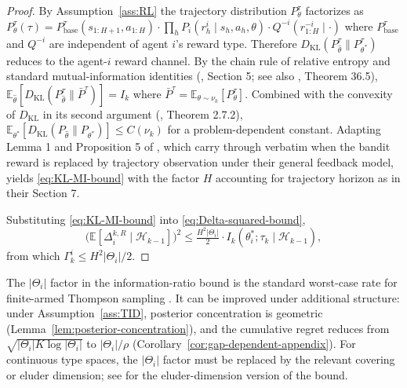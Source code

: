 \begin{proof}
By Assumption~\ref{ass:RL} the trajectory distribution $P_\theta^\tau$ factorizes as $P_\theta^\tau(\tau) = P_{\mathrm{base}}^\tau(s_{1:H+1}, a_{1:H}) \cdot \prod_h P_i(r_h^i \mid s_h, a_h, \theta) \cdot Q^{-i}(r^{-i}_{1:H} \mid \cdot)$ where $P_{\mathrm{base}}^\tau$ and $Q^{-i}$ are independent of agent $i$'s reward type. Therefore $D_{\mathrm{KL}}(P_{\hat{\theta}}^\tau \| P_{\theta^*}^\tau)$ reduces to the agent-$i$ reward channel. By the chain rule of relative entropy and standard mutual-information identities (\citealp{russo2016information}, Section 5; see also \citealp{lattimore2020bandit}, Theorem 36.5), $\mathbb{E}_{\hat{\theta}}[D_{\mathrm{KL}}(P_{\hat{\theta}}^\tau \| \bar{P}^\tau)] = I_k$ where $\bar{P}^\tau = \mathbb{E}_{\theta \sim \nu_k}[P_\theta^\tau]$. Combined with the convexity of $D_{\mathrm{KL}}$ in its second argument (\citealp{cover2006elements}, Theorem 2.7.2), $\mathbb{E}_{\theta^*}[D_{\mathrm{KL}}(P_{\hat{\theta}} \| P_{\theta^*})] \leq C(\nu_k)$ for a problem-dependent constant. Adapting Lemma 1 and Proposition 5 of \citet{russo2016information}, which carry through verbatim when the bandit reward is replaced by trajectory observation under their general feedback model, yields \eqref{eq:KL-MI-bound} with the factor $H$ accounting for trajectory horizon as in their Section 7.

Substituting \eqref{eq:KL-MI-bound} into \eqref{eq:Delta-squared-bound},
\begin{equation}
\big(\mathbb{E}[\Delta_i^{k,R} \mid \mathcal{H}_{k-1}]\big)^2 \leq \tfrac{H^2 |\Theta_i|}{2} \cdot I_k(\theta_i^*; \tau_k \mid \mathcal{H}_{k-1}),
\end{equation}
from which $\Gamma_k^i \leq H^2 |\Theta_i|/2$.
\end{proof}

\begin{remark}
\label{rem:info-ratio-tight}
The $|\Theta_i|$ factor in the information-ratio bound is the standard worst-case rate for finite-armed Thompson sampling \citep{russo2016information}. It can be improved under additional structure: under Assumption~\ref{ass:TID}, posterior concentration is geometric (Lemma~\ref{lem:posterior-concentration}), and the cumulative regret reduces from $\sqrt{|\Theta_i| K \log|\Theta_i|}$ to $|\Theta_i|/\rho$ (Corollary~\ref{cor:gap-dependent-appendix}). For continuous type spaces, the $|\Theta_i|$ factor must be replaced by the relevant covering or eluder dimension; see \citet{russo2014learning} for the eluder-dimension version of the bound.
\end{remark}

